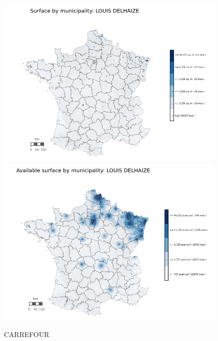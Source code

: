 \documentclass[11pt]{article}
\begin{document}
\begin{figure}[H]
    \caption{CARREFOUR}
	\centering
		\includegraphics[width=15cm]{images/maps_surface/LOUISDELHAIZE.png}
        \includegraphics[width=15cm]{images/maps_available_surface/LOUISDELHAIZE.png}
\end{figure}
\end{document}
